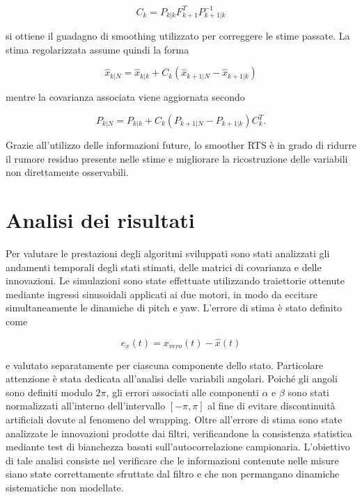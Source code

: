 \documentclass[12pt,a4paper]{article}
\begin{document}
\begin{equation}
C_k = P_{k|k} F_{k+1}^{T} P_{k+1|k}^{-1}
\end{equation}

si ottiene il guadagno di smoothing utilizzato per correggere le stime passate.
La stima regolarizzata assume quindi la forma

\begin{equation}
\hat{x}_{k|N} = \hat{x}_{k|k} + C_k \left( \hat{x}_{k+1|N} - \hat{x}_{k+1|k} \right)
\end{equation}

mentre la covarianza associata viene aggiornata secondo

\begin{equation}
P_{k|N} = P_{k|k} + C_k \left( P_{k+1|N} - P_{k+1|k} \right) C_k^T.
\end{equation}

Grazie all'utilizzo delle informazioni future, lo smoother RTS è in grado di ridurre
il rumore residuo presente nelle stime e migliorare
la ricostruzione delle variabili non direttamente osservabili.

\section{Analisi dei risultati}
Per valutare le prestazioni degli algoritmi sviluppati sono stati analizzati gli andamenti temporali degli stati stimati, delle matrici di covarianza e delle innovazioni.
Le simulazioni sono state effettuate utilizzando traiettorie ottenute mediante ingressi sinusoidali applicati ai due motori, in modo da eccitare simultaneamente le dinamiche di pitch e yaw.
L'errore di stima è stato definito come

\begin{equation}
e_x(t) = x_{vero}(t) - \hat{x}(t)
\end{equation}

e valutato separatamente per ciascuna componente dello stato.
Particolare attenzione è stata dedicata all'analisi delle variabili angolari. 
Poiché gli angoli sono definiti modulo $2\pi$, gli errori associati alle componenti 
$\alpha$ e $\beta$ sono stati normalizzati all'interno dell'intervallo $[-\pi,\pi]$ 
al fine di evitare discontinuità artificiali dovute al fenomeno del wrapping.
Oltre all'errore di stima sono state analizzate le innovazioni prodotte dai filtri, 
verificandone la consistenza statistica mediante test di bianchezza basati sull'autocorrelazione
campionaria.
L'obiettivo di tale analisi consiste nel verificare che le informazioni contenute
nelle misure siano state correttamente sfruttate dal filtro e che non permangano dinamiche
sistematiche non modellate.
\end{document}
